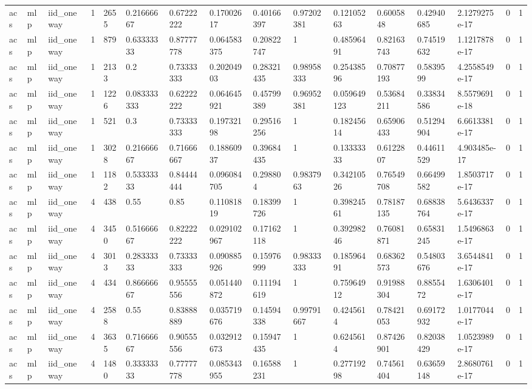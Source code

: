 \begin{tabular}{llllllllllllllll}
acs & mlp & iid\_oneway & 1 & 2655 & 0.21666667 & 0.67222222 & 0.17002617 & 0.40166397 & 0.97202381 & 0.12105263 & 0.6005848 & 0.42940685 & 2.1279275e-17 & 0 & 1 \\
acs & mlp & iid\_oneway & 1 & 879 & 0.63333333 & 0.87777778 & 0.064583375 & 0.20822747 & 1 & 0.48596491 & 0.82163743 & 0.74519632 & 1.1217878e-17 & 0 & 1 \\
acs & mlp & iid\_oneway & 1 & 2133 & 0.2 & 0.73333333 & 0.20204903 & 0.28321435 & 0.98958333 & 0.25438596 & 0.70877193 & 0.5839599 & 4.2558549e-17 & 0 & 1 \\
acs & mlp & iid\_oneway & 1 & 1226 & 0.083333333 & 0.62222222 & 0.064645921 & 0.45799389 & 0.96952381 & 0.059649123 & 0.53684211 & 0.33834586 & 8.5579691e-18 & 0 & 1 \\
acs & mlp & iid\_oneway & 1 & 521 & 0.3 & 0.73333333 & 0.19732198 & 0.29516256 & 1 & 0.18245614 & 0.65906433 & 0.51294904 & 6.6613381e-17 & 0 & 1 \\
acs & mlp & iid\_oneway & 1 & 3028 & 0.21666667 & 0.71666667 & 0.18860937 & 0.39684435 & 1 & 0.13333333 & 0.6122807 & 0.44611529 & 4.903485e-17 & 0 & 1 \\
acs & mlp & iid\_oneway & 1 & 1182 & 0.53333333 & 0.84444444 & 0.096084705 & 0.298804 & 0.9837963 & 0.34210526 & 0.76549708 & 0.66499582 & 1.8503717e-17 & 0 & 1 \\
acs & mlp & iid\_oneway & 4 & 438 & 0.55 & 0.85 & 0.11081819 & 0.18399726 & 1 & 0.39824561 & 0.78187135 & 0.68838764 & 5.6436337e-17 & 0 & 1 \\
acs & mlp & iid\_oneway & 4 & 3450 & 0.51666667 & 0.82222222 & 0.029102967 & 0.17162118 & 1 & 0.39298246 & 0.76081871 & 0.65831245 & 1.5496863e-17 & 0 & 1 \\
acs & mlp & iid\_oneway & 4 & 3013 & 0.28333333 & 0.73333333 & 0.090885926 & 0.15976999 & 0.98333333 & 0.18596491 & 0.68362573 & 0.54803676 & 3.6544841e-17 & 0 & 1 \\
acs & mlp & iid\_oneway & 4 & 434 & 0.86666667 & 0.95555556 & 0.051440872 & 0.11194619 & 1 & 0.75964912 & 0.91988304 & 0.8855472 & 1.6306401e-17 & 0 & 1 \\
acs & mlp & iid\_oneway & 4 & 2588 & 0.55 & 0.83888889 & 0.035719676 & 0.14594338 & 0.99791667 & 0.4245614 & 0.78421053 & 0.69172932 & 1.0177044e-17 & 0 & 1 \\
acs & mlp & iid\_oneway & 4 & 3635 & 0.71666667 & 0.90555556 & 0.032912673 & 0.15947435 & 1 & 0.6245614 & 0.87426901 & 0.82038429 & 1.0523989e-17 & 0 & 1 \\
acs & mlp & iid\_oneway & 4 & 1480 & 0.33333333 & 0.77777778 & 0.085343955 & 0.16588231 & 1 & 0.27719298 & 0.74561404 & 0.63659148 & 2.8680761e-17 & 0 & 1 \\

\end{tabular}
